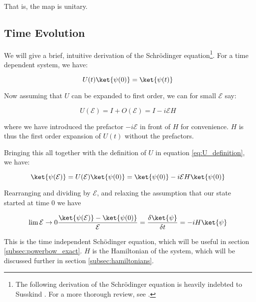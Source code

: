 That is, the map is unitary. 

\subsection{Time Evolution}\label{subsec:time_evolution} 
We will give a brief, intuitive derivation of the Schrödinger equation\footnote{The following derivation of the Schrödinger equation is heavily indebted to Susskind \cite{susskind}. For a more thorough review, see \cite{blundell_qft}.}. For a time dependent system, we have:

\begin{equation}\label{eq:U_definition}
	U(t)\ket{\psi(0)} = \ket	{\psi(t)}
\end{equation}

Now assuming that $U$ can be expanded to first order, we can for small $\mathcal{E}$ say:

\begin{equation}
U(\mathcal{E}) = I + O(\mathcal{E}) = I - i\mathcal{E} H	
\end{equation}

where we have introduced the prefactor $-i\mathcal{E}$ in front of $H$ for convenience. $H$ is thus the first order expansion of $U(t)$ without the prefactors. 

Bringing this all together with the definition of $U$ in equation \ref{eq:U_definition}, we have:

\begin{equation}
	\ket{\psi(\mathcal{E})} = U(\mathcal{E})\ket{\psi(0)} = \ket{\psi(0)} - i\mathcal{E} H \ket{\psi(0)}
\end{equation}

Rearranging and dividing by $\mathcal{E}$, and relaxing the assumption that our state started at time $0$ we have

\begin{equation}
	\lim{\mathcal{E} \to 0} \frac{\ket{\psi(\mathcal{E})} - \ket{\psi(0)}}{\mathcal{E}} = \frac{\delta \ket{\psi}}{\delta t} = -iH \ket{\psi}
\end{equation}

This is the time independent Schödinger equation, which will be useful in section \ref{subsec:powerbow_exact}. $H$ is the Hamiltonian of the system, which will be discussed further in section \ref{subsec:hamiltonians}.

